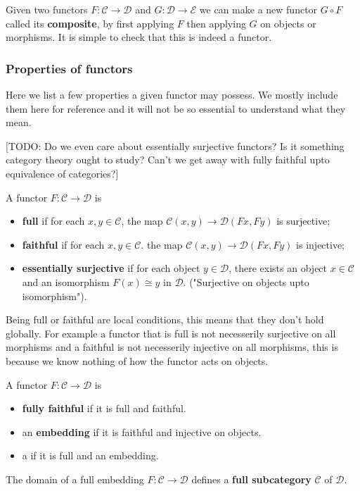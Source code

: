 \begin{remark}
    Given two functors $F : \mathcal{C} \to \mathcal{D}$ and $G : \mathcal{D} \to \mathcal{E}$ we can make a new functor $G \circ F$ called its \textbf{composite}, by first applying $F$ then applying $G$ on objects or morphisms. It is simple to check that this is indeed a functor. 
\end{remark}

\subsubsection{Properties of functors}

Here we list a few properties a given functor may possess. We mostly include them here for reference and it will not be so essential to understand what they mean.

[TODO: Do we even care about essentially surjective functors? Is it something category theory ought to study? Can't we get away with fully faithful upto equivalence of categories?]

\begin{defin}
    A functor $F : \mathcal{C} \to \mathcal{D}$ is
    \begin{itemize}
        \item \textbf{full} if for each $x, y\in \mathcal{C}$, the map $\mathcal{C}(x,y)\to \mathcal{D}(F x, F y)$ is surjective;
        \item \textbf{faithful} if for each $x, y \in \mathcal{C}$. the map $\mathcal{C}(x,y) \to \mathcal{D}(F x, F y)$ is injective;
        \item \textbf{essentially surjective} if for each object $y \in \mathcal{D}$, there exists an object $x \in \mathcal{C}$ and an isomorphism $F(x) \cong y$ in $\mathcal{D}$. ("Surjective on objects upto isomorphism").
    \end{itemize}
\end{defin}

\begin{remark}
    Being full or faithful are local conditions, this means that they don't hold globally. For example a functor that is full is not necesserily surjective on all morphisms and a faithful is not necesserily injective on all morphisms, this is because we know nothing of how the functor acts on objects. 
\end{remark}

\begin{defin}
    A functor $F : \mathcal{C} \to \mathcal{D}$ is
    \begin{itemize}
        \item \textbf{fully faithful} if it is full and faithful.
        \item an \textbf{embedding} if it is faithful and injective on objects.
        \item a  if it is full and an embedding.
    \end{itemize}
    The domain of a full embedding $F : \mathcal{C} \to \mathcal{D}$ defines a \textbf{full subcategory} $\mathcal{C}$ of $\mathcal{D}$.
\end{defin}


